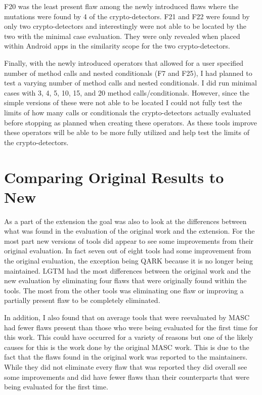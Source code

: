 F20 was the least present flaw among the newly introduced flaws where the mutations were found by 4 of the crypto-detectors. F21 and F22 were found by only two crypto-detectors and interestingly were not able to be located by the two with the minimal case evaluation. They were only revealed when placed within Android apps in the similarity scope for the two crypto-detectors.

Finally, with the newly introduced operators that allowed for a user specified number of method calls and nested conditionals (F7 and F25), I had planned to test a varying number of method calls and nested conditionals. I did run minimal cases with 3, 4, 5, 10, 15, and 20 method calls/conditionals. However, since the simple versions of these were not able to be located I could not fully test the limits of how many calls or conditionals the crypto-detectors actually evaluated before stopping as planned when creating these operators. As these tools improve these operators will be able to be more fully utilized and help test the limits of the crypto-detectors.






\section{Comparing Original Results to New}
\label{ch5:sec:comparison}

As a part of the extension the goal was also to look at the differences between what was found in the evaluation of the original work and the extension. For the most part new versions of tools did appear to see some improvements from their original evaluation. In fact seven out of eight tools had some improvement from the original evaluation, the exception being QARK because it is no longer being maintained. LGTM had the most differences between the original work and the new evaluation by eliminating four flaws that were originally found within the tools. The most from the other tools was eliminating one flaw or improving a partially present flaw to be completely eliminated. 

In addition, I also found that on average tools that were reevaluated by MASC had fewer flaws present than those who were being evaluated for the first time for this work. This could have occurred for a variety of reasons but one of the likely causes for this is the work done by the original MASC work. This is due to the fact that the flaws found in the original work was reported to the maintainers. While they did not eliminate every flaw that was reported they did overall see some improvements and did have fewer flaws than their counterparts that were being evaluated for the first time.

